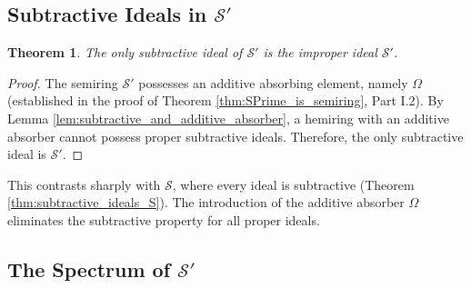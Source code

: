 \documentclass[11pt, a4paper]{article}
\theoremstyle{plain}
\newtheorem{theorem}{Theorem}[section]
\theoremstyle{definition}
\numberwithin{equation}{section}
\newcommand{\OmegaObj}{\Omega} %
\newcommand{\SemiringS}{\mathcal{S}}
\newcommand{\SemiringSPrime}{\mathcal{S}'}
\begin{document}
\subsection{Subtractive Ideals in $\SemiringSPrime$}

\begin{theorem}\label{thm:subtractive_ideals_SPrime}
The only subtractive ideal of $\SemiringSPrime$ is the improper ideal $\SemiringSPrime$.
\end{theorem}
\begin{proof}
The semiring $\SemiringSPrime$ possesses an additive absorbing element, namely $\OmegaObj$ (established in the proof of Theorem \ref{thm:SPrime_is_semiring}, Part I.2).
By Lemma \ref{lem:subtractive_and_additive_absorber}, a hemiring with an additive absorber cannot possess proper subtractive ideals.
Therefore, the only subtractive ideal is $\SemiringSPrime$.
\end{proof}

This contrasts sharply with $\SemiringS$, where every ideal is subtractive (Theorem \ref{thm:subtractive_ideals_S}). The introduction of the additive absorber $\OmegaObj$ eliminates the subtractive property for all proper ideals.

\subsection{The Spectrum of $\SemiringSPrime$}
\end{document}
